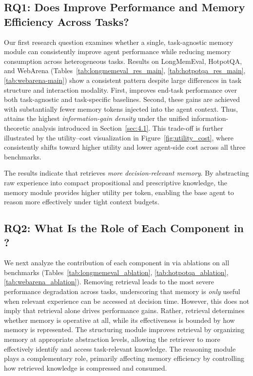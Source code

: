\subsection{RQ1: Does \plugmem Improve Performance and Memory Efficiency Across Tasks?}
Our first research question examines whether a single, task-agnostic memory module can consistently improve agent performance while reducing memory consumption across heterogeneous tasks.
Results on LongMemEval, HotpotQA, and WebArena (Tables~\ref{tab:longmemeval_res_main}, \ref{tab:hotpotqa_res_main}, \ref{tab:webarena-main}) show a consistent pattern despite large differences in task structure and interaction modality.
First, \plugmem improves end-task performance over both task-agnostic and task-specific baselines.
Second, these gains are achieved with substantially fewer memory tokens injected into the agent context. 
Thus, \plugmem attains the highest \emph{information-gain density} under the unified information-theoretic analysis introduced in Section~\ref{sec:4.1}.
This trade-off is further illustrated by the utility–cost visualization in Figure~\ref{fig:utility_cost}, where \plugmem consistently shifts toward higher utility and lower agent-side cost across all three benchmarks.

The results indicate that \plugmem retrieves \emph{more decision-relevant memory}.
By abstracting raw experience into compact propositional and prescriptive knowledge, the memory module provides higher utility per token, enabling the base agent to reason more effectively under tight context budgets.

\subsection{RQ2: What Is the Role of Each Component in \plugmem?}

We next analyze the contribution of each component in \plugmem via ablations on all benchmarks (Tables~\ref{tab:longmemeval_ablation}, \ref{tab:hotpotqa_ablation}, \ref{tab:webarena_ablation}).
Removing retrieval leads to the most severe performance degradation across tasks, underscoring that memory is \textit{only} useful when relevant experience can be accessed at decision time.
However, this does not imply that retrieval alone drives performance gains.
Rather, retrieval determines whether memory is operative at all, while its effectiveness is bounded by how memory is represented.
The structuring module improves retrieval by organizing memory at appropriate abstraction levels, allowing the retriever to more effectively identify and access task-relevant knowledge.
The reasoning module plays a complementary role, primarily affecting memory efficiency by controlling how retrieved knowledge is compressed and consumed.

